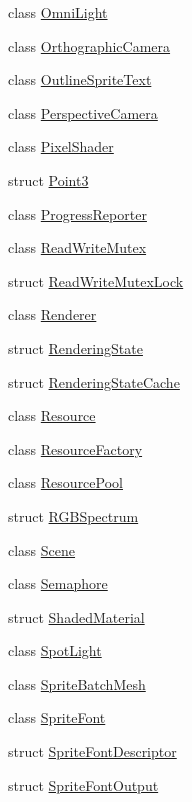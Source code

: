 \begin{DoxyCompactItemize}
class \hyperlink{classmage_1_1_omni_light}{Omni\+Light}
\item 
class \hyperlink{classmage_1_1_orthographic_camera}{Orthographic\+Camera}
\item 
class \hyperlink{classmage_1_1_outline_sprite_text}{Outline\+Sprite\+Text}
\item 
class \hyperlink{classmage_1_1_perspective_camera}{Perspective\+Camera}
\item 
class \hyperlink{classmage_1_1_pixel_shader}{Pixel\+Shader}
\item 
struct \hyperlink{structmage_1_1_point3}{Point3}
\item 
class \hyperlink{classmage_1_1_progress_reporter}{Progress\+Reporter}
\item 
class \hyperlink{classmage_1_1_read_write_mutex}{Read\+Write\+Mutex}
\item 
struct \hyperlink{structmage_1_1_read_write_mutex_lock}{Read\+Write\+Mutex\+Lock}
\item 
class \hyperlink{classmage_1_1_renderer}{Renderer}
\item 
struct \hyperlink{structmage_1_1_rendering_state}{Rendering\+State}
\item 
struct \hyperlink{structmage_1_1_rendering_state_cache}{Rendering\+State\+Cache}
\item 
class \hyperlink{classmage_1_1_resource}{Resource}
\item 
class \hyperlink{classmage_1_1_resource_factory}{Resource\+Factory}
\item 
class \hyperlink{classmage_1_1_resource_pool}{Resource\+Pool}
\item 
struct \hyperlink{structmage_1_1_r_g_b_spectrum}{R\+G\+B\+Spectrum}
\item 
class \hyperlink{classmage_1_1_scene}{Scene}
\item 
class \hyperlink{classmage_1_1_semaphore}{Semaphore}
\item 
struct \hyperlink{structmage_1_1_shaded_material}{Shaded\+Material}
\item 
class \hyperlink{classmage_1_1_spot_light}{Spot\+Light}
\item 
class \hyperlink{classmage_1_1_sprite_batch_mesh}{Sprite\+Batch\+Mesh}
\item 
class \hyperlink{classmage_1_1_sprite_font}{Sprite\+Font}
\item 
struct \hyperlink{structmage_1_1_sprite_font_descriptor}{Sprite\+Font\+Descriptor}
\item 
struct \hyperlink{structmage_1_1_sprite_font_output}{Sprite\+Font\+Output}

\end{DoxyCompactItemize}
